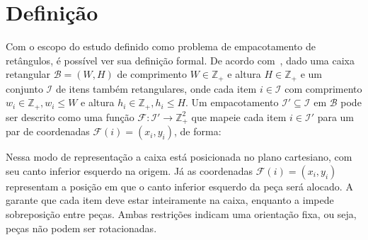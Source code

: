 \section{Definição}\label{sec:definicao}

Com o escopo do estudo definido como problema de empacotamento de retângulos, é possível ver sua
definição formal.
De acordo com~\cite{2DPackLib}, dado uma caixa retangular $\mathcal{B} = (W, H)$ de comprimento
$W \in \mathbb{Z}_+$ e altura $H \in \mathbb{Z}_+$ e um conjunto $\mathcal{I}$ de itens também
retangulares, onde cada item $i \in \mathcal{I}$ com comprimento $w_i \in \mathbb{Z}_+, w_i \le W$
e altura $h_i \in \mathbb{Z}_+, h_i \le H$.
Um empacotamento $\mathcal{I}' \subseteq \mathcal{I}$ em $\mathcal{B}$ pode ser descrito como uma função
$\mathcal{F}: \mathcal{I}' \to \mathbb{Z}_+^2$ que mapeie cada item $i \in \mathcal{I}'$ para um par
de coordenadas $\mathcal{F}(i) = (x_i, y_i)$, de forma:



Nessa modo de representação a caixa está posicionada no plano cartesiano, com seu canto inferior
esquerdo na origem.
Já as coordenadas $\mathcal{F}(i) = (x_i, y_i)$ representam a posição em que o canto inferior
esquerdo da peça será alocado.
A  garante que cada item deve estar inteiramente na caixa, enquanto a 
impede sobreposição entre peças.
Ambas restrições indicam uma orientação fixa, ou seja, peças não podem ser rotacionadas.
